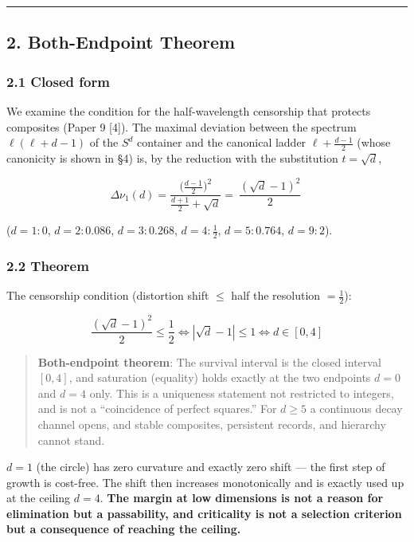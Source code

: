 \documentclass[
]{article}
\begin{document}
\begin{center}\rule{0.5\linewidth}{0.5pt}\end{center}

\subsection{2. Both-Endpoint Theorem}\label{both-endpoint-theorem}

\subsubsection{2.1 Closed form}\label{closed-form}

We examine the condition for the half-wavelength censorship that
protects composites (Paper 9 {[}4{]}). The maximal deviation between the
spectrum \(\ell(\ell+d-1)\) of the \(S^d\) container and the canonical
ladder \(\ell+\tfrac{d-1}2\) (whose canonicity is shown in §4) is, by
the reduction with the substitution \(t=\sqrt d\),

\[
\Delta\nu_1(d)=\frac{\bigl(\tfrac{d-1}2\bigr)^2}{\tfrac{d+1}2+\sqrt d}=\boxed{\ \frac{(\sqrt d-1)^2}{2}\ }
\]

(\(d=1:0\), \(d=2:0.086\), \(d=3:0.268\), \(d=4:\tfrac12\),
\(d=5:0.764\), \(d=9:2\)).

\subsubsection{2.2 Theorem}\label{theorem}

The censorship condition (distortion shift $\le$ half the resolution
\(=\tfrac12\)):

\[
\frac{(\sqrt d-1)^2}{2}\le\frac12\iff|\sqrt d-1|\le1\iff d\in[0,4]
\]

\begin{quote}
\textbf{Both-endpoint theorem}: The survival interval is the closed
interval \([0,4]\), and saturation (equality) holds exactly at the two
endpoints \(d=0\) and \(d=4\) only. This is a uniqueness statement not
restricted to integers, and is not a ``coincidence of perfect squares.''
For \(d\ge5\) a continuous decay channel opens, and stable composites,
persistent records, and hierarchy cannot stand.
\end{quote}

\(d=1\) (the circle) has zero curvature and exactly zero shift --- the
first step of growth is cost-free. The shift then increases
monotonically and is exactly used up at the ceiling \(d=4\). \textbf{The
margin at low dimensions is not a reason for elimination but a
passability, and criticality is not a selection criterion but a
consequence of reaching the ceiling.}
\end{document}
